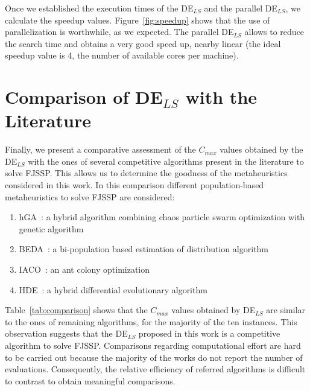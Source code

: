 Once we established the execution times of the DE$_{LS}$ and the parallel DE$_{LS}$, we calculate the speedup values. Figure~\ref{fig:speedup} shows that the use of parallelization is worthwhile, as we expected. The parallel DE$_{LS}$ allows to reduce the search time and obtains a very good speed up, nearby linear (the ideal speedup value is 4, the number of available cores per machine).

\section{Comparison of DE$_{LS}$ with the Literature} \label{sec:compara}

Finally, we present a comparative assessment of the $C_{max}$ values obtained by the DE$_{LS}$ with the ones of several competitive algorithms present in the literature to solve FJSSP. This allows us to determine the goodness of the metaheuristics considered in this work. In this comparison different population-based metaheuristics to solve FJSSP are considered: 
\begin{enumerate}[label=\textit{\roman*})]

\item hGA~\cite{tang2011}: a hybrid algorithm combining chaos particle swarm optimization with genetic algorithm

\item BEDA~\cite{Wang2012917}: a bi-population based estimation of distribution algorithm

\item IACO~\cite{WANG2017}: an ant colony optimization

\item HDE~\cite{YUAN2013246}: a hybrid differential evolutionary algorithm 

\end{enumerate}

Table~\ref{tab:comparison} shows that the $C_{max}$ values obtained by DE$_{LS}$ are similar to the ones of remaining algorithms, for the majority of the ten instances. This observation suggests that the DE$_{LS}$ proposed in this work is a competitive algorithm to solve FJSSP. Comparisons regarding computational effort are hard to be carried out because the majority of the works do not report the number of evaluations. Consequently, the relative efficiency of referred algorithms is difficult to contrast to obtain meaningful comparisons.



